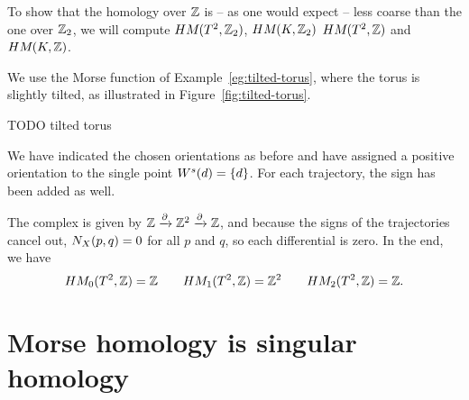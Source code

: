     To show that the homology over $\Z$ is -- as one would expect -- less coarse than the one over $\Z_2$, we will compute $\HMf{T^2, \Z_2}$, $\HMf{K, \Z_2}$
    $\HMf{T^2, \Z}$ and $\HMf{K, \Z}$.




\begin{eg}
    We use the Morse function of Example~\ref{eg:tilted-torus}, where the torus is slightly tilted, as illustrated in Figure~\ref{fig:tilted-torus}.
    \begin{marginfigure}
        \centering
        \caption{TODO tilted torus}
        \label{fig:tilted-torus}
    \end{marginfigure}
    We have indicated the chosen orientations as before and have assigned a positive orientation to the single point $\stable d = \{d\}$.
    For each trajectory, the sign has been added as well.

    The complex is given by $\Z \xrightarrow{\partial} \Z^2 \xrightarrow{\partial}  \Z$, and because the signs of the trajectories cancel out, $\NX Xpq = 0$ for all $p$ and $q$, so each differential is zero.
    In the end, we have
    \[
        \HMf[0]{T^2, \Z} = \Z \qquad
        \HMf[1]{T^2, \Z} = \Z^2 \qquad
        \HMf[2]{T^2, \Z} = \Z
    .\] 
\end{eg}




\section*{Morse homology is singular homology}

